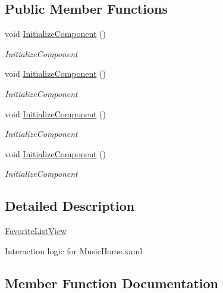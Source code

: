 \subsection*{Public Member Functions}
\begin{DoxyCompactItemize}
\item 
void \hyperlink{class_presentation_1_1_view_1_1_list_1_1_favorite_list_view_a63a1effe9695d3d0757c0b7144603ab5}{Initialize\+Component} ()
\begin{DoxyCompactList}\small\item\em Initialize\+Component \end{DoxyCompactList}\item 
void \hyperlink{class_presentation_1_1_view_1_1_list_1_1_favorite_list_view_a63a1effe9695d3d0757c0b7144603ab5}{Initialize\+Component} ()
\begin{DoxyCompactList}\small\item\em Initialize\+Component \end{DoxyCompactList}\item 
void \hyperlink{class_presentation_1_1_view_1_1_list_1_1_favorite_list_view_a63a1effe9695d3d0757c0b7144603ab5}{Initialize\+Component} ()
\begin{DoxyCompactList}\small\item\em Initialize\+Component \end{DoxyCompactList}\item 
void \hyperlink{class_presentation_1_1_view_1_1_list_1_1_favorite_list_view_a63a1effe9695d3d0757c0b7144603ab5}{Initialize\+Component} ()
\begin{DoxyCompactList}\small\item\em Initialize\+Component \end{DoxyCompactList}\end{DoxyCompactItemize}


\subsection{Detailed Description}
\hyperlink{class_presentation_1_1_view_1_1_list_1_1_favorite_list_view}{Favorite\+List\+View} 

Interaction logic for Music\+Home.\+xaml 

\subsection{Member Function Documentation}
\mbox{\label{class_presentation_1_1_view_1_1_list_1_1_favorite_list_view_a63a1effe9695d3d0757c0b7144603ab5}} 
